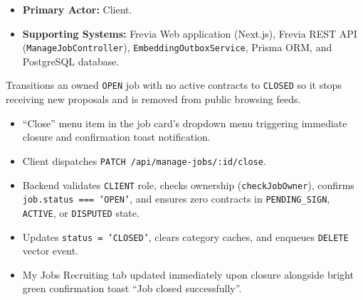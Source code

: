 \begin{itemize}[leftmargin=1.6em,topsep=3pt,itemsep=2pt,parsep=0pt,label=$\bullet$]
    \item \textbf{Primary Actor:} Client.
    \item \textbf{Supporting Systems:} Frevia Web application (Next.js), Frevia REST API (\texttt{ManageJobController}), \texttt{EmbeddingOutboxService}, Prisma ORM, and PostgreSQL database.
\end{itemize}

\noindent Transitions an owned \texttt{OPEN} job with no active contracts to \texttt{CLOSED} so it stops receiving new proposals and is removed from public browsing feeds.

\begin{itemize}[leftmargin=1.6em,topsep=3pt,itemsep=2pt,parsep=0pt,label=$\bullet$]
    \item ``Close'' menu item in the job card's dropdown menu triggering immediate closure and confirmation toast notification.
\end{itemize}

\begin{itemize}[leftmargin=1.6em,topsep=3pt,itemsep=2pt,parsep=0pt,label=$\bullet$]
    \item Client dispatches \texttt{PATCH /api/manage-jobs/:id/close}.
    \item Backend validates \texttt{CLIENT} role, checks ownership (\texttt{checkJobOwner}), confirms \texttt{job.status === 'OPEN'}, and ensures zero contracts in \texttt{PENDING\_SIGN}, \texttt{ACTIVE}, or \texttt{DISPUTED} state.
    \item Updates \texttt{status = 'CLOSED'}, clears category caches, and enqueues \texttt{DELETE} vector event.
\end{itemize}

\begin{itemize}[leftmargin=1.6em,topsep=3pt,itemsep=2pt,parsep=0pt,label=$\bullet$]
    \item My Jobs Recruiting tab updated immediately upon closure alongside bright green confirmation toast ``Job closed successfully''.
\end{itemize}


